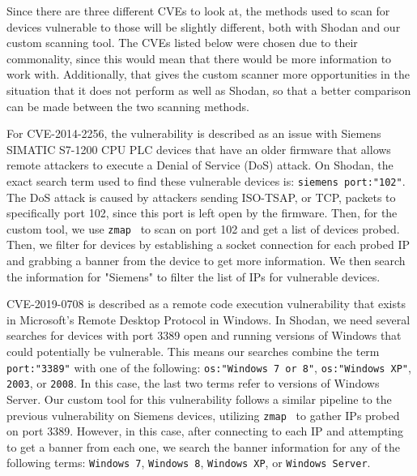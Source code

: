 Since there are three different CVEs to look at, the methods used to scan
for devices vulnerable to those will be slightly different, both with
Shodan and our custom scanning tool. The CVEs listed below were chosen due 
to their commonality, since this would mean that there would be more 
information to work with. Additionally, that gives the custom scanner more 
opportunities in the situation that it does not perform as well as Shodan, 
so that a better comparison can be made between the two scanning methods.

For CVE-2014-2256, the vulnerability is described as an issue with Siemens
SIMATIC S7-1200 CPU PLC devices that have an older firmware that allows remote
attackers to execute a Denial of Service (DoS) attack\cite{CVE-2014-2256}. On Shodan, the exact
search term used to find these vulnerable devices is: \verb|siemens port:"102"|.
The DoS attack is caused by attackers sending ISO-TSAP, or TCP, packets to
specifically port 102, since this port is left open by the firmware. Then, for
the custom tool, we use \verb|zmap|~\cite{zmap} to scan on port 102 and get a list of devices
probed. Then, we filter for devices by establishing a socket connection for each probed IP
and grabbing a banner from the device to get more information. We then search the information
for "Siemens" to filter the list of IPs for vulnerable devices.

CVE-2019-0708 is described as a remote code execution vulnerability that
exists in Microsoft's Remote Desktop Protocol in Windows\cite{CVE-2019-0708}. In Shodan, we need
several searches for devices with port 3389 open and running versions of 
Windows that could potentially be vulnerable. This means our searches combine
the term \verb|port:"3389"| with one of the following: \verb|os:"Windows 7 or 8"|,
\verb|os:"Windows XP"|, \verb|2003|, or \verb|2008|. In this case, the last two
terms refer to versions of Windows Server. Our custom tool for this vulnerability follows
a similar pipeline to the previous vulnerability on Siemens devices, utilizing \verb|zmap|~\cite{zmap}
to gather IPs probed on port 3389. However, in this case, after connecting to each IP and
attempting to get a banner from each one, we search the banner information for any of the
following terms: \verb|Windows 7|, \verb|Windows 8|, \verb|Windows XP|, or \verb|Windows Server|.

